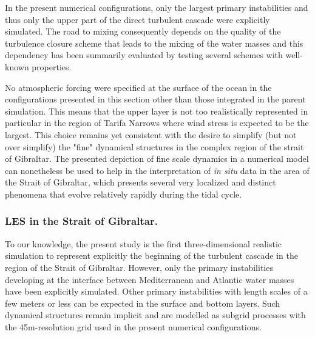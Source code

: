 In the present numerical configurations, only the largest primary instabilities and thus only the upper part of the direct turbulent cascade were explicitly simulated. The road to mixing consequently depends on the quality of the turbulence closure scheme that leads to the mixing of the water masses and this dependency has been summarily evaluated by testing several schemes with well-known properties. 

No atmospheric forcing were specified at the surface of the ocean in the configurations presented in this section \color{red}other than those integrated in the parent simulation\color{black}. This means that the upper layer is not too realistically represented in particular in the region of Tarifa Narrows where wind stress is expected to be the largest. This choice remains yet consistent with the desire to simplify (but not over simplify) the "fine" dynamical structures in the complex region of the strait of Gibraltar. %
\color{red}The presented depiction of fine scale dynamics in a numerical model can nonetheless be used to help in the interpretation of \textit{in situ} data in the area of the Strait of Gibraltar, which presents several very localized and distinct phenomena that evolve relatively rapidly during the tidal cycle.\color{black}

\subsubsection{LES in the Strait of Gibraltar.}
To our knowledge, the present study is the first\color{red} three-dimensional realistic simulation to represent explicitly the beginning of the turbulent cascade in the region of the Strait of Gibraltar\color{black}. However, only the primary instabilities developing at the interface between Mediterranean and Atlantic water masses have been explicitly simulated. Other primary instabilities  with length scales of a few meters or less can be expected in the surface and bottom layers. Such dynamical structures remain implicit and are modelled as subgrid processes with the 45m-resolution grid used in the present numerical configurations.

